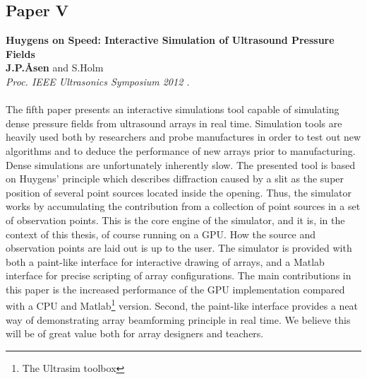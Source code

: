 \subsection{Paper V}
\textbf{Huygens on Speed: Interactive Simulation of Ultrasound Pressure Fields}\\
\textbf{J.\:P.\:\AA{}sen} and S.\:Holm\\
{\it Proc. IEEE Ultrasonics Symposium 2012 .}\\\\
The fifth paper presents an interactive simulations tool capable of simulating dense pressure fields from ultrasound arrays in real time. Simulation tools are heavily used both by researchers and probe manufactures in order to test out new algorithms and to deduce the performance of new arrays prior to manufacturing. Dense simulations are unfortunately inherently slow. The presented tool is based on Huygens' principle which describes diffraction caused by a slit as the super position of several point sources located inside the opening. Thus, the simulator works by accumulating the contribution from a collection of point sources in a set of observation points. This is the core engine of the simulator, and it is, in the context of this thesis, of course running on a GPU. How the source and observation points are laid out is up to the user. The simulator is provided with both a paint-like interface for interactive drawing of arrays, and a Matlab interface for precise scripting of array configurations. The main contributions in this paper is the increased performance of the GPU implementation compared with a CPU and Matlab\footnote{The Ultrasim toolbox } version. Second, the paint-like interface provides a neat way of demonstrating array beamforming principle in real time. We believe this will be of great value both for array designers and teachers.

